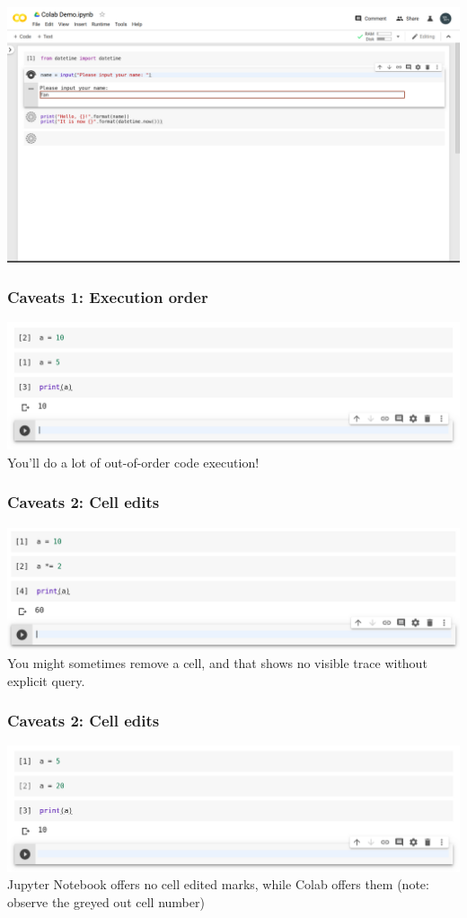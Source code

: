 \documentclass[aspectratio=169]{beamer}
\begin{document}
\begin{frame}
    \includegraphics[width=\textwidth]{images/colab-demo.png}
\end{frame}

\begin{frame}
    \frametitle{Caveats 1: Execution order}
    \includegraphics[width=\textwidth]{images/colab-ooo-execution.png}
    \pause
    You'll do a lot of out-of-order code execution!
\end{frame}

\begin{frame}
    \frametitle{Caveats 2: Cell edits}
    \includegraphics[width=\textwidth]{images/colab-removed-cell.png}
    \pause
    You might sometimes remove a cell, and that shows no visible trace without explicit query.
\end{frame}

\begin{frame}
    \frametitle{Caveats 2: Cell edits}
    \includegraphics[width=\textwidth]{images/colab-edited-cells.png}
    \pause
    Jupyter Notebook offers no cell edited marks, while Colab offers them
    \pause
    (note: observe the greyed out cell number)
\end{frame}
\end{document}
